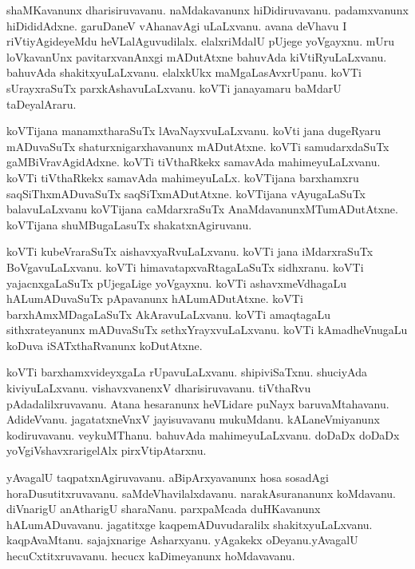 \documentclass{article}
\begin{document}
\begin{mn}%
shaMKavanunx dharisiruvavanu. naMdakavanunx hiDidiruvavanu. padamxvanunx hiDididAdxne. garuDaneV 
vAhanavAgi uLaLxvanu. avana deVhavu I riVtiyAgideyeMdu heVLalAguvudilalx. elalxriMdalU pUjege 
yoVgayxnu. mUru loVkavanUnx pavitarxvanAnxgi mADutAtxne bahuvAda kiVtiRyuLaLxvanu. bahuvAda 
shakitxyuLaLxvanu. elalxkUkx maMgaLasAvxrUpanu. koVTi sUrayxraSuTx parxkAshavuLaLxvanu. koVTi 
janayamaru baMdarU taDeyalAraru.
\end{mn}

\begin{mn}%
koVTijana manamxtharaSuTx lAvaNayxvuLaLxvanu. koVti jana dugeRyaru mADuvaSuTx shaturxnigarxhavanunx 
mADutAtxne. koVTi samudarxdaSuTx gaMBiVravAgidAdxne. koVTi tiVthaRkekx samavAda mahimeyuLaLxvanu. 
koVTi tiVthaRkekx samavAda mahimeyuLaLx. koVTijana barxhamxru saqSiThxmADuvaSuTx saqSiTxmADutAtxne. 
koVTijana vAyugaLaSuTx balavuLaLxvanu koVTijana caMdarxraSuTx AnaMdavanunxMTumADutAtxne. koVTijana 
shuMBugaLasuTx shakatxnAgiruvanu.
\end{mn}

\begin{mn}%
koVTi kubeVraraSuTx aishavxyaRvuLaLxvanu. koVTi jana iMdarxraSuTx BoVgavuLaLxvanu. koVTi 
himavatapxvaRtagaLaSuTx sidhxranu. koVTi yajacnxgaLaSuTx pUjegaLige yoVgayxnu. koVTi 
ashavxmeVdhagaLu hALumADuvaSuTx pApavanunx hALumADutAtxne. koVTi barxhAmxMDagaLaSuTx 
AkAravuLaLxvanu. koVTi amaqtagaLu sithxrateyanunx mADuvaSuTx sethxYrayxvuLaLxvanu. koVTi 
kAmadheVnugaLu koDuva iSATxthaRvanunx koDutAtxne.
\end{mn}

\begin{mn}%
koVTi barxhamxvideyxgaLa rUpavuLaLxvanu. shipiviSaTxnu. shuciyAda kiviyuLaLxvanu. vishavxvanenxV 
dharisiruvavanu. tiVthaRvu pAdadalilxruvavanu. Atana hesaranunx heVLidare puNayx baruvaMtahavanu. 
AdideVvanu. jagatatxneVnxV jayisuvavanu mukuMdanu. kALaneVmiyanunx kodiruvavanu. veykuMThanu. 
bahuvAda mahimeyuLaLxvanu. doDaDx doDaDx yoVgiVshavxrarigelAlx pirxVtipAtarxnu.
\end{mn}

\begin{mn}%
yAvagalU taqpatxnAgiruvavanu. aBipArxyavanunx hosa sosadAgi horaDusutitxruvavanu. 
saMdeVhavilalxdavanu. narakAsurananunx koMdavanu. diVnarigU anAtharigU sharaNanu. parxpaMcada 
duHKavanunx hALumADuvavanu. jagatitxge kaqpemADuvudaralilx shakitxyuLaLxvanu. kaqpAvaMtanu. 
sajajxnarige Asharxyanu. yAgakekx oDeyanu.yAvagalU hecuCxtitxruvavanu. hecucx kaDimeyanunx 
hoMdavavanu.
\end{mn}
\end{document}
